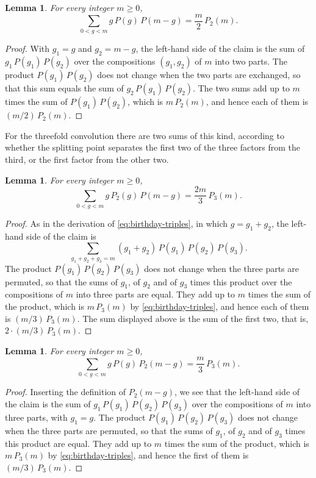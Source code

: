 \documentclass{amsart}
\newtheorem{lemma}[theorem]{Lemma}
\theoremstyle{definition}
\theoremstyle{remark}
\numberwithin{equation}{section}
\begin{document}
\begin{lemma}\label{lem:twofoldmean}
For every integer $m\ge0$,
\[
\sum_{0<g<m}g\,P(g)\,P(m-g)=\frac{m}{2}\,P_2(m).
\]
\end{lemma}

\begin{proof}
With $g_1=g$ and $g_2=m-g$, the left-hand side of the claim is the sum of
$g_1\,P(g_1)\,P(g_2)$ over the compositions $(g_1,g_2)$ of $m$ into two
parts. The product $P(g_1)\,P(g_2)$ does not change when the two parts are
exchanged, so that this sum equals the sum of $g_2\,P(g_1)\,P(g_2)$. The
two sums add up to $m$ times the sum of $P(g_1)\,P(g_2)$, which is
$m\,P_2(m)$, and hence each of them is $(m/2)\,P_2(m)$.
\end{proof}

For the threefold convolution there are two sums of this kind, according to
whether the splitting point separates the first two of the three factors
from the third, or the first factor from the other two.

\begin{lemma}\label{lem:threefoldleft}
For every integer $m\ge0$,
\[
\sum_{0<g<m}g\,P_2(g)\,P(m-g)=\frac{2m}{3}\,P_3(m).
\]
\end{lemma}

\begin{proof}
As in the derivation of \eqref{eq:birthday-triples}, in which
$g=g_1+g_2$, the left-hand side of the claim is
\[
\sum_{g_1+g_2+g_3=m}(g_1+g_2)\,P(g_1)\,P(g_2)\,P(g_3).
\]
The product $P(g_1)\,P(g_2)\,P(g_3)$ does not change when the three parts
are permuted, so that the sums of $g_1$, of $g_2$ and of $g_3$ times this
product over the compositions of $m$ into three parts are equal. They add
up to $m$ times the sum of the product, which is $m\,P_3(m)$ by
\eqref{eq:birthday-triples}, and hence each of them is $(m/3)\,P_3(m)$.
The sum displayed above is the sum of the first two, that is,
$2\cdot(m/3)\,P_3(m)$.
\end{proof}

\begin{lemma}\label{lem:threefoldright}
For every integer $m\ge0$,
\[
\sum_{0<g<m}g\,P(g)\,P_2(m-g)=\frac{m}{3}\,P_3(m).
\]
\end{lemma}

\begin{proof}
Inserting the definition of $P_2(m-g)$, we see that the left-hand side of
the claim is the sum of $g_1\,P(g_1)\,P(g_2)\,P(g_3)$ over the compositions
of $m$ into three parts, with $g_1=g$. The product $P(g_1)\,P(g_2)\,P(g_3)$
does not change when the three parts are permuted, so that the sums of
$g_1$, of $g_2$ and of $g_3$ times this product are equal. They add up to
$m$ times the sum of the product, which is $m\,P_3(m)$ by
\eqref{eq:birthday-triples}, and hence the first of them is
$(m/3)\,P_3(m)$.
\end{proof}
\end{document}
